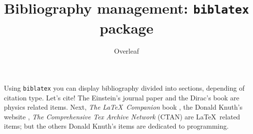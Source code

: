 \documentclass{article}
\title{Bibliography management: \texttt{biblatex} package}
\author{Overleaf}
\date{ }
\begin{document}
	
	\maketitle
	
	Using \texttt{biblatex} you can display bibliography divided into sections, 
	depending of citation type. 
	Let's cite! The Einstein's journal paper \cite{einstein} and the Dirac's 
	book \cite{dirac} are physics related items. 
	Next, \textit{The \LaTeX\ Companion} book \cite{latexcompanion}, the Donald 
	Knuth's website \cite{knuthwebsite}, \textit{The Comprehensive Tex Archive 
		Network} (CTAN) \cite{ctan} are \LaTeX\ related items; but the others Donald 
	Knuth's items \cite{knuth-fa,knuth-acp} are dedicated to programming. 
	
	\medskip
	
	\printbibliography[title={Whole bibliography}]
	
\end{document}
